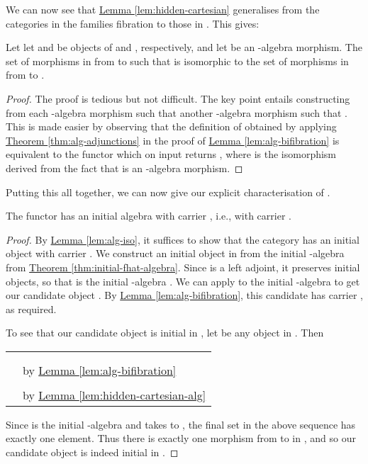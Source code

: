 \documentclass{LMCS}
\newcommand{\lemref}[1]{\hyperref[#1]{Lemma \ref*{#1}}}
\newcommand{\thmref}[1]{\hyperref[#1]{Theorem \ref*{#1}}}
\begin{document}
We can now see that \lemref{lem:hidden-cartesian} generalises from the
categories in the families fibration to those in . This gives:

\begin{lem}\label{lem:hidden-cartesian-alg}
  Let let  and  be objects of  and
  , respectively, and let  be an -algebra morphism. The set
  of morphisms  in  from  to  such that  is
  isomorphic to the set of morphisms in  from
   to .
\end{lem}
\begin{proof}
  The proof is tedious but not difficult. The key point entails
  constructing from each -algebra morphism  such that  another -algebra morphism
   such that . This is made
  easier by observing that the definition of  obtained by
  applying \thmref{thm:alg-adjunctions} in the proof of
  \lemref{lem:alg-bifibration} is equivalent to the functor which on
  input  returns , where  is the isomorphism derived from the fact that
   is an -algebra morphism.
\end{proof}

Putting this all together, we can now give our explicit
characterisation of .

\begin{thm}\label{thm:muFalpha-initial}
  The functor  has an initial algebra with carrier
  , i.e., with carrier .
\end{thm}
\begin{proof}
  By \lemref{lem:alg-iso}, it suffices to show that the category
   has an initial object with carrier
  . We construct an initial object
  in  from the initial -algebra
   from
  \thmref{thm:initial-fhat-algebra}. Since  is a
  left adjoint, it preserves initial objects, so that
   is the initial -algebra .
  We can apply  to the initial
  -algebra to get our candidate object
  . By \lemref{lem:alg-bifibration}, this
  candidate has carrier , as
  required.

  To see that our candidate object is initial in
  , let  be any
  object in . Then

  \begin{tabular}{cl}
    &
     \\ 
    &  \\ 
    & \hspace{11cm}by \lemref{lem:alg-bifibration} \\
    &  \\ 
    & \hspace{11cm}by \lemref{lem:hidden-cartesian-alg} \\
  \end{tabular}

  \noindent
  Since  is
  the initial -algebra and  takes  to
  , the final set in the above sequence has exactly one
  element. Thus there is exactly one morphism from
   to  in
  , and so our candidate object is indeed
  initial in .
\end{proof}
\end{document}
